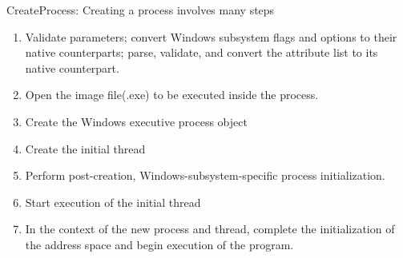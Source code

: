\documentclass[letterpaper,10pt,draftclsnofoot,onecolumn]{IEEEtran}
\begin{document}
CreateProcess: Creating a process involves many steps
\begin{enumerate}
\item Validate parameters; convert Windows subsystem flags and options to their native counterparts; parse, validate, and convert the attribute list to its native counterpart.
\item Open the image file(.exe) to be executed inside the process.
\item Create the Windows executive process object
\item Create the initial thread
\item Perform post-creation, Windows-subsystem-specific process initialization.
\item Start execution of the initial thread
\item In the context of the new process and thread, complete the initialization of the address space and begin execution of the program.
\end{enumerate}
\end{document}
